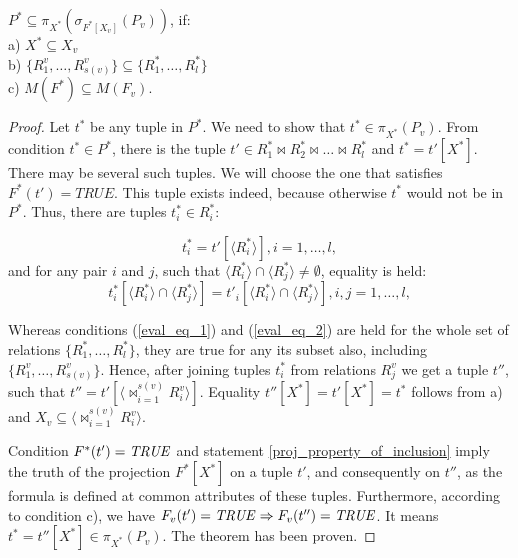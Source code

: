\begin{theorem}
$P^{\ast} \subseteq \pi_{X^{\ast}} (\sigma_{F^{\ast}[X_v]} (P_{v}))$, if:
\\a) $X^{\ast} \subseteq X_{v}$
\\b) $ \{R^{v}_{1}, \ldots, R^{v}_{s(v)}\} \subseteq \{R^{\ast}_{1}, \ldots,
R^{\ast}_{l}\} $
\\c) $M (F^{\ast}) \subseteq M (F_{v}) $.
\label{th_base}
\end{theorem}
\begin{proof}
Let $t^{\ast}$ be any tuple in $P^{\ast}$. We need to show that
$t^{\ast} \in \pi_{X^{\ast}} (P_{v})$. From condition  $t^{\ast} \in P^{\ast}$,
there is the tuple $t' \in R^{\ast}_1 \Join R^{\ast}_2\Join\ldots
\Join R^{\ast}_l$ and $t^{\ast} = t'[X^{\ast}]$. There may be several such tuples.
We will choose the one that satisfies $F^{\ast}(t')=TRUE$. This tuple exists
indeed, because otherwise $t^{\ast}$ would not be in $P^{\ast}$. Thus, there
are tuples $t^{\ast}_i \in R^{\ast}_i$:

\begin{equation}
t^{\ast}_i = t'[\langle R^{\ast}_i\rangle], i = 1,\dots,l,
\label{eval_eq_1}
\end{equation}
\def \intersecij {\langle R^{\ast}_i \rangle \cap \langle R^{\ast}_j \rangle}
and for any pair $i$ and $j$, such that  $\intersecij \neq \emptyset$, equality is held:
\begin{equation}
t^{\ast}_i[\intersecij] = t'_i[\intersecij], i,j = 1,\dots,l,
\label{eval_eq_2}
\end{equation}

Whereas conditions (\ref{eval_eq_1}) and (\ref{eval_eq_2}) are held for the
whole set of relations $\{R^{\ast}_{1}, \ldots, R^{\ast}_{l}\}$, they are
true for any its subset also, including $\{R^{v}_{1}, \ldots, R^{v}_{s(v)}\}$.
Hence, after joining tuples $t^{\ast}_i$ from relations $R^{v}_j$ we get a tuple
$t''$, such that $t'' = t'[\langle {\Join}_{i=1}^{s(v)} R^v_i \rangle]$.
Equality $t''[X^{\ast}] = t'[X^{\ast}] = t^{\ast}$ follows from a) and $X_v
\subseteq \langle {\Join}_{i=1}^{s(v)} R^v_i \rangle$.

Condition  $F^{\ast}(t') = \mathit{TRUE}$ and statement 
\ref{proj_property_of_inclusion} imply the truth of the projection $F^{\ast}
[X^{\ast}]$ on a tuple $t'$, and consequently on $t''$, as the formula is defined at common attributes of these tuples. Furthermore, according to condition c), we have $F_v (t') = \mathit{TRUE} \Rightarrow F_v (t'') = \mathit{TRUE}$.
It means $t^{\ast} = t''[X^{\ast}] \in \pi_{X^{\ast}} (P_{v})$.
The theorem has been proven.
\end{proof}
